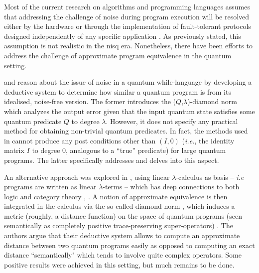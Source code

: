 Most of the current research on algorithms and programming languages assumes that addressing the challenge of noise during program execution will be resolved either by the hardware or through the implementation of fault-tolerant protocols designed independently of any specific application \cite{chong2017programming}. As previously stated, this assumption is not realistic in the \acrshort{nisq} era. Nonetheless, there have been efforts to address the challenge of approximate program equivalence in the quantum setting. 

\cite{hung2019quantitative} and \cite{tao2021gleipnir} reason about the issue of noise in a quantum while-language by developing a deductive system to determine how similar a quantum program is from its idealised, noise-free version. The former introduces the ($Q$,$\lambda$)-diamond norm which analyzes the output error given that the input quantum state satisfies some quantum predicate $Q$ to degree $\lambda$. However, it does not specify any practical method for obtaining non-trivial quantum predicates. In fact, the methods used in \cite{hung2019quantitative} cannot produce any post conditions other than $(I,0)$ (\textit{i.e.}, the identity matrix $I$ to degree 0, analogous to a ``true” predicate) for large quantum programs. The latter specifically addresses and delves into this aspect.  

An alternative approach was explored in \cite{dahlqvist2022syntactic}, using linear $\lambda$-calculus as basis – \textit{i.e} programs are written as linear $\lambda$-terms – which has deep connections to both logic and category theory \cite{girard1995advances}, \cite{benton1994mixed}. A notion of approximate equivalence is then
integrated in the calculus via the so-called diamond norm , which induces a metric (roughly, a distance function) on the space of quantum programs (seen semantically as completely positive trace-preserving super-operators) \cite{watrous2018theory}. The authors argue that their deductive system allows to compute an approximate distance between two quantum programs easily as opposed to computing an exact distance ``semantically" which tends to involve quite complex operators.  Some positive results were achieved in this setting, but much remains to be done.





